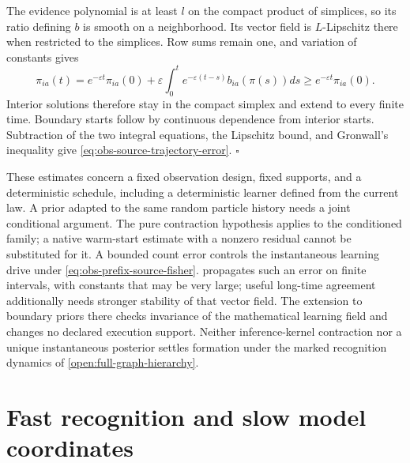 The evidence polynomial is at least $l$ on the compact product of simplices,
so its ratio defining $b$ is smooth on a neighborhood. Its vector field is
$L$-Lipschitz there when restricted to the simplices. Row sums remain one,
and variation of constants gives
\begin{equation}
\pi_{ia}(t)=e^{-\varepsilon t}\pi_{ia}(0)
+\varepsilon\int_0^t e^{-\varepsilon(t-s)}b_{ia}(\pi(s))ds
\ge e^{-\varepsilon t}\pi_{ia}(0).
\end{equation}
Interior solutions therefore stay in the compact simplex and extend to every
finite time. Boundary starts follow by continuous dependence from interior
starts. Subtraction of the two integral equations, the Lipschitz bound, and
Gronwall's inequality give \cref{eq:obs-source-trajectory-error}. $\square$

These estimates concern a fixed observation design, fixed supports, and a
deterministic schedule, including a deterministic learner defined from the
current law. A prior adapted to the same random particle history needs a joint
conditional argument. The pure contraction hypothesis applies to the
conditioned family; a native warm-start estimate with a nonzero residual cannot
be substituted for it. A bounded count error controls the instantaneous
learning drive under \cref{eq:obs-prefix-source-fisher}.
 propagates such an error on finite
intervals, with constants that may be very large; useful long-time agreement
additionally needs stronger stability of that vector field. The extension to
boundary priors there checks invariance of the mathematical learning field
and changes no declared execution support.
Neither inference-kernel contraction nor a unique instantaneous posterior
settles formation under the marked recognition dynamics of
\cref{open:full-graph-hierarchy}. 

\section{Fast recognition and slow model coordinates}
\label{sec:obs-fast-slow}

